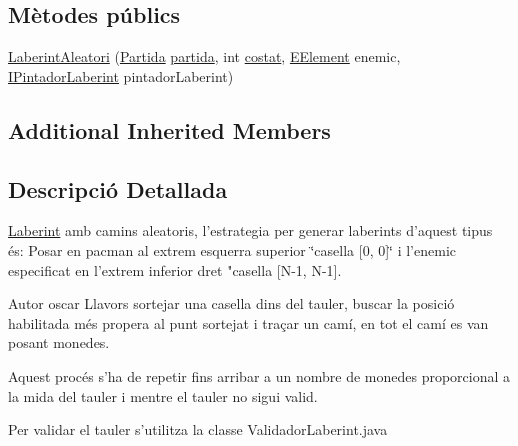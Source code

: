 \subsection*{Mètodes públics}
\begin{DoxyCompactItemize}
\item 
\hyperlink{classlogica_1_1laberints_1_1_laberint_aleatori_aafae50e4b6d51475d8e53d7fee61785b}{Laberint\+Aleatori} (\hyperlink{classlogica_1_1_partida}{Partida} \hyperlink{classlogica_1_1laberints_1_1_laberint_a7183ce070714f73e078bb36e8c21b575}{partida}, int \hyperlink{classlogica_1_1laberints_1_1_laberint_ae874ac4889592b811709f5b967d85286}{costat}, \hyperlink{enumlogica_1_1enumeracions_1_1_e_element}{E\+Element} enemic, \hyperlink{interfaceinterficie_1_1_i_pintador_laberint}{I\+Pintador\+Laberint} pintador\+Laberint)
\end{DoxyCompactItemize}
\subsection*{Additional Inherited Members}


\subsection{Descripció Detallada}
\hyperlink{classlogica_1_1laberints_1_1_laberint}{Laberint} amb camins aleatoris, l'estrategia per generar laberints d'aquest tipus és\+: Posar en pacman al extrem esquerra superior \char`\"{}casella \mbox{[}0, 0\mbox{]}\char`\"{} i l'enemic especificat en l'extrem inferior dret "casella \mbox{[}N-\/1, N-\/1\mbox{]}. 

\begin{DoxyAuthor}{Autor}
oscar Llavors sortejar una casella dins del tauler, buscar la posició habilitada més propera al punt sortejat i traçar un camí, en tot el camí es van posant monedes.
\end{DoxyAuthor}
Aquest procés s'ha de repetir fins arribar a un nombre de monedes proporcional a la mida del tauler i mentre el tauler no sigui valid.

Per validar el tauler s'utilitza la classe Validador\+Laberint.\+java 

